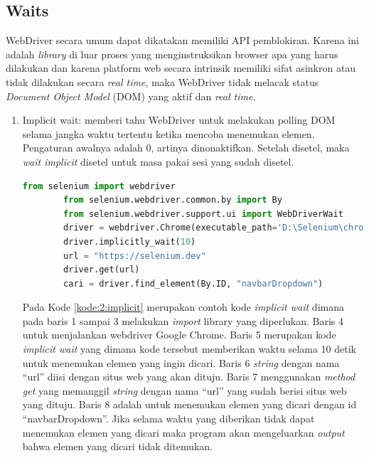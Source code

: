 \subsection{Waits}
WebDriver secara umum dapat dikatakan memiliki API pemblokiran. Karena ini adalah \textit{library} di luar proses yang menginstruksikan browser apa yang harus dilakukan dan karena platform web secara intrinsik memiliki sifat asinkron atau tidak dilakukan secara \textit{real time}, maka WebDriver tidak melacak status \textit{Document Object Model} (DOM) yang aktif dan \textit{real time}.
\begin{enumerate}
	\item Implicit wait: memberi tahu WebDriver untuk melakukan polling DOM selama jangka waktu tertentu ketika mencoba menemukan elemen. Pengaturan awalnya adalah 0, artinya dinonaktifkan. Setelah disetel, maka \textit{wait implicit} disetel untuk masa pakai sesi yang sudah disetel.
	\begin{lstlisting}[language=python, caption=Contoh kode Implicit wait, label=kode:2:implicit]
		from selenium import webdriver
		from selenium.webdriver.common.by import By
		from selenium.webdriver.support.ui import WebDriverWait
		driver = webdriver.Chrome(executable_path='D:\Selenium\chromedriver.exe')
		driver.implicitly_wait(10)
		url = "https://selenium.dev"
		driver.get(url)
		cari = driver.find_element(By.ID, "navbarDropdown")
	\end{lstlisting}
	Pada Kode \ref{kode:2:implicit} merupakan contoh kode \textit{implicit wait} dimana pada baris 1 sampai 3 melakukan \textit{import} library yang diperlukan. Baris 4 untuk menjalankan webdriver Google Chrome. Baris 5 merupakan kode \textit{implicit wait} yang dimana kode tersebut memberikan waktu selama 10 detik untuk menemukan elemen yang ingin dicari. Baris 6 \textit{string} dengan nama ``url'' diisi dengan situs web yang akan dituju. Baris 7 menggunakan \textit{method get} yang memanggil \textit{string} dengan nama ``url'' yang sudah berisi situs web yang dituju. Baris 8 adalah untuk menemukan elemen yang dicari dengan id ``navbarDropdown''. Jika selama waktu yang diberikan tidak dapat menemukan elemen yang dicari maka program akan mengeluarkan \textit{output} bahwa elemen yang dicari tidak ditemukan.
	

\end{enumerate}
